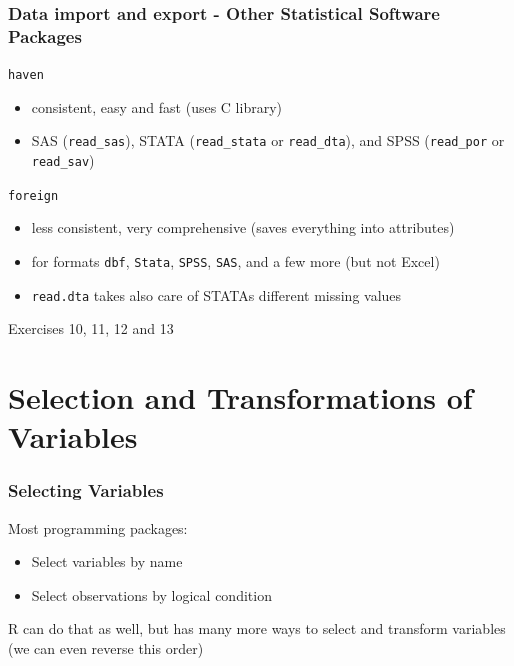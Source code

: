 \documentclass[xcolor={svgnames},10pt,
handout
]{beamer}
\begin{document}
\begin{frame}[fragile]
\frametitle{Data import and export - Other Statistical Software Packages}
\lstinline|haven|
\begin{itemize}
\item consistent, easy and fast (uses C library)
\item SAS (\lstinline|read_sas|), STATA (\lstinline|read_stata| or \lstinline|read_dta|), and SPSS (\lstinline|read_por| or \lstinline|read_sav|)
\end{itemize}
\lstinline|foreign|
\begin{itemize}
	\item less consistent, very comprehensive (saves everything into attributes)
	\item for formats \texttt{dbf}, \texttt{Stata}, \texttt{SPSS}, \texttt{SAS}, and a few more (but not Excel)
	\item \lstinline|read.dta| takes also care of STATAs different missing values
\end{itemize}

\end{frame}

\begin{frame}[standout]
Exercises 10, 11, 12 and 13
\end{frame}


\section{Selection and Transformations of Variables}

\begin{frame}\frametitle{Selecting Variables}
Most programming packages:
\begin{itemize}
	\item Select variables by name
	\item Select observations by logical condition
\end{itemize}
R can do that as well, but has many more ways to select and transform variables (we can even reverse this order)
\end{frame}
\end{document}

